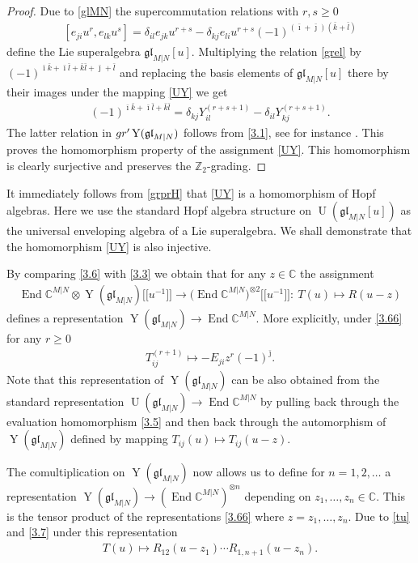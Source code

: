 \documentclass[11pt]{article}
\numberwithin{equation}{section}
\def\bi{{\bar\imath }}
\def\bj{{\bar\jmath }}
\def\bk{{\bar k }}
\def\bl{{\bar l }}
\def\CC{{\mathbb{C}}}
\def\CMN{\CC^{M|N}}
\def\de{\delta}
\def\End{\operatorname{End}}
\def\g{\glMN [u]}
\def\ge{\geqslant}
\def\glMN{\mathfrak{gl}_{M|N}}
\def\grpr{{\rm gr}^{\prime} }
\def\ot{\otimes}
\def\UMN{\operatorname{U}(\glMN)}
\def\Ug{\operatorname{U}(\g)}
\def\YMN{\operatorname{Y}(\glMN)}
\def\ZZ{\mathbb{Z}}
\begin{document}
\begin{proof}
Due to \eqref{glMN} the supercommutation relations with $r ,s\ge0$
\begin{gather}
\label{grel}
[ e_{ji} u^{r}, e_{lk} u^{s} ]=
\de_{il} e_{jk} u^{r+s}-
\de_{kj} e_{li} u^{r+s}
{(-1)}^{( \bi+ \bj )( \bk+ \bl )}
\end{gather}
define the Lie superalgebra $\g $.
Multiplying the relation \eqref{grel} by
$(-1)^{\bi \bk + \bi \bl + \bk \bl+\bj+\bl}$
and replacing the basis elements of $\g$ there by their images
under the mapping \eqref{UY} we get
\begin{gather*}
[ Y_{ij}^{(r+1)},Y_{kl}^{(s+1)} \bigr]
(-1)^{\bi \bk + \bi \bl + \bk \bl}=
\de_{kj} Y_{il}^{(r+s+1)}-\de_{il} Y_{kj}^{(r+s+1)} .
\end{gather*}
The latter relation in $\grpr\YMN$ follows from \eqref{3.1},
see for instance \cite[Section 1]{MNO}.
This proves the homomorphism property of the assignment \eqref{UY}.
This homomorphism is clearly surjective
and preserves the $\ZZ_{2}$-grading.
\end{proof}

It immediately follows from \eqref{grprH} that
\eqref{UY} is a homomorphism of Hopf algebras.
Here we use the standard Hopf algebra structure on $\Ug$
as the universal enveloping algebra of a Lie superalgebra.
We shall demonstrate that the homomorphism \eqref{UY} is also injective.

By comparing \eqref{3.6} with \eqref{3.3}
we obtain that for any $z\in\CC$ the assignment
\begin{gather}\label{3.66}
\End\CMN\ot\YMN \big[\big[u^{-1}\big]\big]
\to
\big(\End\CMN\big)^{\ot 2} \big[\big[u^{-1}\big]\big]\colon \
T(u)\mapsto R(u-z)
\end{gather}
defines a representation $\YMN\to\End\CMN$. More explicitly, under
\eqref{3.66} for any $r\ge0$
\begin{gather}
\label{2.19}
T_{ij}^{(r+1)}\mapsto
- E_{ji} z^{r} {(-1)}^{\bj} .
\end{gather}
Note that this representation of $\YMN$
can be also obtained from the standard representation $\UMN\to\End\CMN$
by pulling back through the evaluation homomorphism \eqref{3.5}
and then back through the automorphism of $\YMN$ defined by mapping
$
T_{ij}(u)\mapsto T_{ij}(u-z) .
$

The comultiplication on $\YMN$
now allows us to define for $n=1 ,2 , \dots$ a representation
$\YMN\to(\End\CMN)^{\ot n}$ depending on
$z_1,\dots, z_n\in\CC $. This is the tensor product of
the representations \eqref{3.66} where $z=z_1,\dots, z_n $.
Due to \eqref{tu} and \eqref{3.7} under this representation
\begin{gather}\label{3.666}
T(u)\mapsto R_{12}(u-z_1) \cdots R_{1,n+1}(u-z_n) .
\end{gather}
\end{document}
